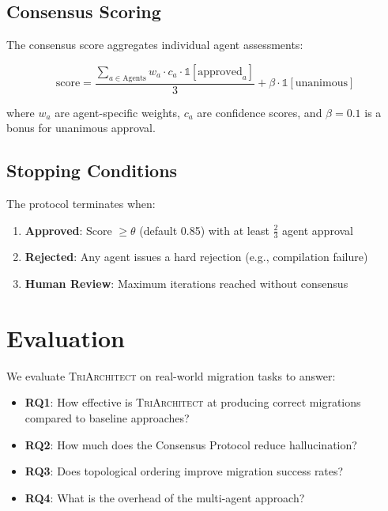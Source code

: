\documentclass[sigconf,review,anonymous]{acmart}
\begin{document}
\subsection{Consensus Scoring}

The consensus score aggregates individual agent assessments:

\begin{equation}
\text{score} = \frac{\sum_{a \in \text{Agents}} w_a \cdot c_a \cdot \mathbb{1}[\text{approved}_a]}{3} + \beta \cdot \mathbb{1}[\text{unanimous}]
\end{equation}

where $w_a$ are agent-specific weights, $c_a$ are confidence scores, and $\beta = 0.1$ is a bonus for unanimous approval.

\subsection{Stopping Conditions}

The protocol terminates when:
\begin{enumerate}
    \item \textbf{Approved}: Score $\geq \theta$ (default 0.85) with at least $\frac{2}{3}$ agent approval
    \item \textbf{Rejected}: Any agent issues a hard rejection (e.g., compilation failure)
    \item \textbf{Human Review}: Maximum iterations reached without consensus
\end{enumerate}

\section{Evaluation}
\label{sec:evaluation}

We evaluate \textsc{TriArchitect} on real-world migration tasks to answer:

\begin{itemize}
    \item \textbf{RQ1}: How effective is \textsc{TriArchitect} at producing correct migrations compared to baseline approaches?
    \item \textbf{RQ2}: How much does the Consensus Protocol reduce hallucination?
    \item \textbf{RQ3}: Does topological ordering improve migration success rates?
    \item \textbf{RQ4}: What is the overhead of the multi-agent approach?
\end{itemize}
\end{document}
